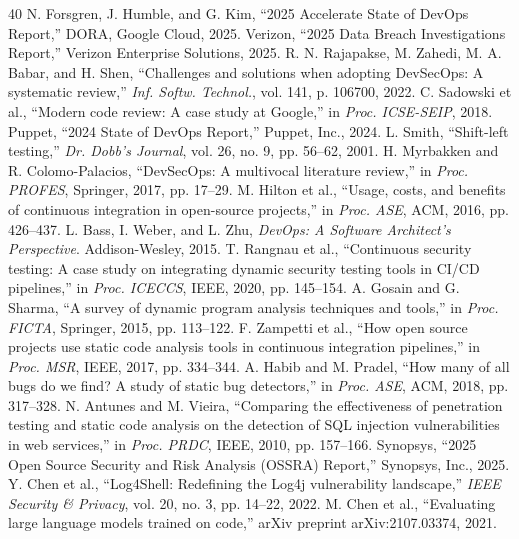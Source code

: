 \documentclass[journal]{IEEEtran}
\begin{document}
\begin{thebibliography}{40}
 N. Forsgren, J. Humble, and G. Kim, ``2025 Accelerate State of DevOps Report,'' DORA, Google Cloud, 2025.
 Verizon, ``2025 Data Breach Investigations Report,'' Verizon Enterprise Solutions, 2025.
 R. N. Rajapakse, M. Zahedi, M. A. Babar, and H. Shen, ``Challenges and solutions when adopting DevSecOps: A systematic review,'' \textit{Inf. Softw. Technol.}, vol. 141, p. 106700, 2022.
 C. Sadowski et al., ``Modern code review: A case study at Google,'' in \textit{Proc. ICSE-SEIP}, 2018.
 Puppet, ``2024 State of DevOps Report,'' Puppet, Inc., 2024.
 L. Smith, ``Shift-left testing,'' \textit{Dr. Dobb's Journal}, vol. 26, no. 9, pp. 56--62, 2001.
 H. Myrbakken and R. Colomo-Palacios, ``DevSecOps: A multivocal literature review,'' in \textit{Proc. PROFES}, Springer, 2017, pp. 17--29.
 M. Hilton et al., ``Usage, costs, and benefits of continuous integration in open-source projects,'' in \textit{Proc. ASE}, ACM, 2016, pp. 426--437.
 L. Bass, I. Weber, and L. Zhu, \textit{DevOps: A Software Architect's Perspective}. Addison-Wesley, 2015.
 T. Rangnau et al., ``Continuous security testing: A case study on integrating dynamic security testing tools in CI/CD pipelines,'' in \textit{Proc. ICECCS}, IEEE, 2020, pp. 145--154.
 A. Gosain and G. Sharma, ``A survey of dynamic program analysis techniques and tools,'' in \textit{Proc. FICTA}, Springer, 2015, pp. 113--122.
 F. Zampetti et al., ``How open source projects use static code analysis tools in continuous integration pipelines,'' in \textit{Proc. MSR}, IEEE, 2017, pp. 334--344.
 A. Habib and M. Pradel, ``How many of all bugs do we find? A study of static bug detectors,'' in \textit{Proc. ASE}, ACM, 2018, pp. 317--328.
 N. Antunes and M. Vieira, ``Comparing the effectiveness of penetration testing and static code analysis on the detection of SQL injection vulnerabilities in web services,'' in \textit{Proc. PRDC}, IEEE, 2010, pp. 157--166.
 Synopsys, ``2025 Open Source Security and Risk Analysis (OSSRA) Report,'' Synopsys, Inc., 2025.
 Y. Chen et al., ``Log4Shell: Redefining the Log4j vulnerability landscape,'' \textit{IEEE Security \& Privacy}, vol. 20, no. 3, pp. 14--22, 2022.
 M. Chen et al., ``Evaluating large language models trained on code,'' arXiv preprint arXiv:2107.03374, 2021.

\end{thebibliography}
\end{document}

